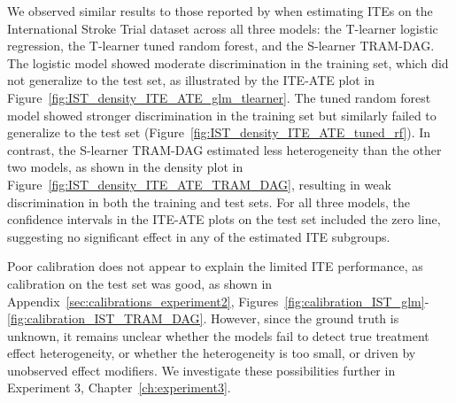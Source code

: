 We observed similar results to those reported by \citet{chen2025} when estimating ITEs on the International Stroke Trial dataset across all three models: the T-learner logistic regression, the T-learner tuned random forest, and the S-learner TRAM-DAG. The logistic model showed moderate discrimination in the training set, which did not generalize to the test set, as illustrated by the ITE-ATE plot in Figure~\ref{fig:IST_density_ITE_ATE_glm_tlearner}. The tuned random forest model showed stronger discrimination in the training set but similarly failed to generalize to the test set (Figure~\ref{fig:IST_density_ITE_ATE_tuned_rf}). In contrast, the S-learner TRAM-DAG estimated less heterogeneity than the other two models, as shown in the density plot in Figure~\ref{fig:IST_density_ITE_ATE_TRAM_DAG}, resulting in weak discrimination in both the training and test sets. For all three models, the confidence intervals in the ITE-ATE plots on the test set included the zero line, suggesting no significant effect in any of the estimated ITE subgroups.

\medskip


Poor calibration does not appear to explain the limited ITE performance, as calibration on the test set was good, as shown in Appendix~\ref{sec:calibrations_experiment2}, Figures~\ref{fig:calibration_IST_glm}-\ref{fig:calibration_IST_TRAM_DAG}. However, since the ground truth is unknown, it remains unclear whether the models fail to detect true treatment effect heterogeneity, or whether the heterogeneity is too small, or driven by unobserved effect modifiers. We investigate these possibilities further in Experiment 3, Chapter~\ref{ch:experiment3}.


